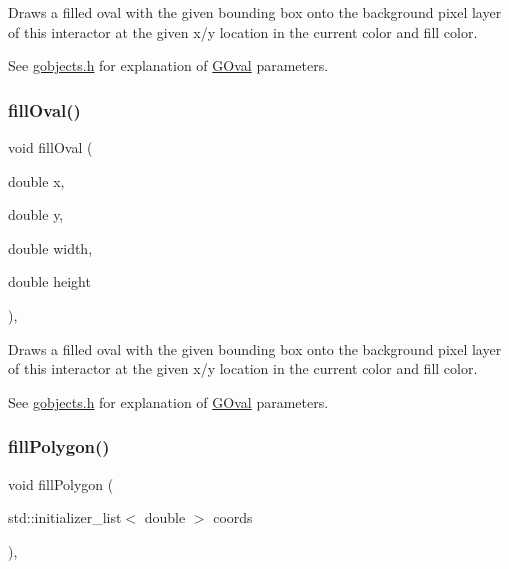 Draws a filled oval with the given bounding box onto the background pixel layer of this interactor at the given x/y location in the current color and fill color. 

See \mbox{\hyperlink{gobjects_8h_source}{gobjects.\+h}} for explanation of \mbox{\hyperlink{classGOval}{G\+Oval}} parameters. \mbox{\label{classGDrawingSurface_a28c700c82f31cd328a4629273420ee61}} 
\subsubsection{\texorpdfstring{fill\+Oval()}{fillOval()}\hspace{0.1cm}{\footnotesize\ttfamily [2/2]}}
{\footnotesize\ttfamily void fill\+Oval (\begin{DoxyParamCaption}\item[{double}]{x,  }\item[{double}]{y,  }\item[{double}]{width,  }\item[{double}]{height }\end{DoxyParamCaption})\hspace{0.3cm}{\ttfamily [virtual]}, {\ttfamily [inherited]}}



Draws a filled oval with the given bounding box onto the background pixel layer of this interactor at the given x/y location in the current color and fill color. 

See \mbox{\hyperlink{gobjects_8h_source}{gobjects.\+h}} for explanation of \mbox{\hyperlink{classGOval}{G\+Oval}} parameters. \mbox{\label{classGDrawingSurface_a15f8c1c4409ef51c1a30a92a195b8f66}} 
\subsubsection{\texorpdfstring{fill\+Polygon()}{fillPolygon()}\hspace{0.1cm}{\footnotesize\ttfamily [1/2]}}
{\footnotesize\ttfamily void fill\+Polygon (\begin{DoxyParamCaption}\item[{std\+::initializer\+\_\+list$<$ double $>$}]{coords }\end{DoxyParamCaption})\hspace{0.3cm}{\ttfamily [virtual]}, {\ttfamily [inherited]}}



